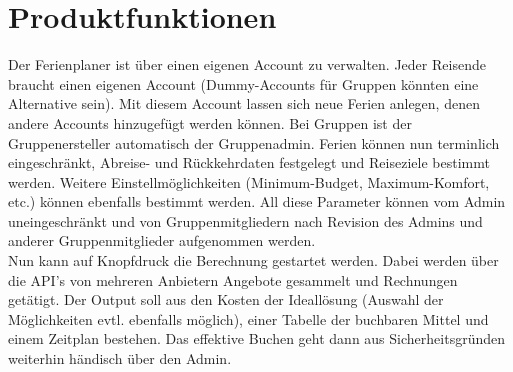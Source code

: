 \documentclass[10pt,a4paper,titlepage,twoside,german]{zhawreprt}
\begin{document}
\chapter{Produktfunktionen}\label{chp:ProductFunctions}
Der Ferienplaner ist über einen eigenen Account zu verwalten. Jeder Reisende braucht einen eigenen Account (Dummy-Accounts für Gruppen könnten eine Alternative sein). Mit diesem Account lassen sich neue Ferien anlegen, denen andere Accounts hinzugefügt werden können. Bei Gruppen ist der Gruppenersteller automatisch der Gruppenadmin. Ferien können nun terminlich eingeschränkt, Abreise- und Rückkehrdaten festgelegt und Reiseziele bestimmt werden. Weitere Einstellmöglichkeiten (Minimum-Budget, Maximum-Komfort, etc.) können ebenfalls bestimmt werden. All diese Parameter können vom Admin uneingeschränkt und von Gruppenmitgliedern nach Revision des Admins und anderer Gruppenmitglieder aufgenommen werden.\\
Nun kann auf Knopfdruck die Berechnung gestartet werden. Dabei werden über die API's von mehreren Anbietern Angebote gesammelt und Rechnungen getätigt. Der Output soll aus den Kosten der Ideallösung (Auswahl der Möglichkeiten evtl. ebenfalls möglich), einer Tabelle der buchbaren Mittel und einem Zeitplan bestehen. Das effektive Buchen geht dann aus Sicherheitsgründen weiterhin händisch über den Admin.
\end{document}
